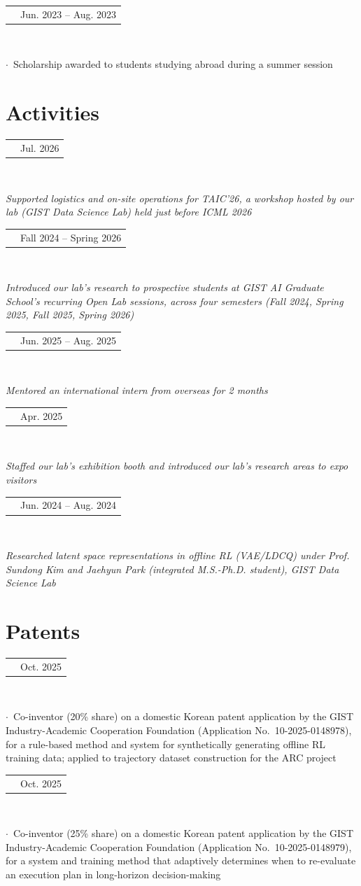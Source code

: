 \documentclass[10.5pt,a4paper]{article}
\makeatletter
\newcommand{\entry}[3]{%
  \noindent\begin{tabularx}{\linewidth}{@{}>{\raggedright\arraybackslash}X r@{}}
    {\hyphenpenalty=10000\exhyphenpenalty=10000\textbf{#1}} & \textcolor{textgray}{#2}
  \end{tabularx}\\
  {\raggedright\textit{\textcolor{textgray}{#3}}\par}\vspace{0.5em}
}
\newcommand{\fund}[3]{%
  \noindent\begin{tabularx}{\linewidth}{@{}>{\raggedright\arraybackslash}X r@{}}
    {\hyphenpenalty=10000\exhyphenpenalty=10000\textbf{#1}} & \textcolor{textgray}{#2}
  \end{tabularx}\\
  {\raggedright\textcolor{textgray}{$\cdot$\ #3}\par}\vspace{0.5em}
}
\makeatother
\begin{document}
\fund{Scholarship for Summer Session Abroad (UC Berkeley)}{Jun. 2023 -- Aug. 2023}
{Scholarship awarded to students studying abroad during a summer session}

\section{Activities}

\entry{TAIC'26: Thinking about AI's Capability -- Operations Staff}{Jul. 2026}
{Supported logistics and on-site operations for TAIC'26, a workshop hosted by our lab (GIST Data Science Lab) held just before ICML 2026}

\entry{GIST AI Graduate School Open Lab -- Lab Presenter}{Fall 2024 -- Spring 2026}
{Introduced our lab's research to prospective students at GIST AI Graduate School's recurring Open Lab sessions, across four semesters (Fall 2024, Spring 2025, Fall 2025, Spring 2026)}

\entry{GIST Global Internship Program (GIP) -- Mentor}{Jun. 2025 -- Aug. 2025}
{Mentored an international intern from overseas for 2 months}

\entry{2025 Korea Science \& Technology Grand Fair ({\cjkfont 대한민국과학기술대전}) -- Booth Staff}{Apr. 2025}
{Staffed our lab's exhibition booth and introduced our lab's research areas to expo visitors}

\entry{GIST Summer Undergraduate Research Fellowship (G-SURF) -- Researcher}{Jun. 2024 -- Aug. 2024}
{Researched latent space representations in offline RL (VAE/LDCQ) under Prof. Sundong Kim and Jaehyun Park (integrated M.S.-Ph.D. student), GIST Data Science Lab}

\newpage
\section{Patents}

\fund{{\cjkfont\bfseries [특허출원] 오프라인 강화학습을 위한 규칙 기반 합성 데이터 생성 방법 및 시스템}}{Oct. 2025}
{Co-inventor (20\% share) on a domestic Korean patent application by the GIST Industry-Academic Cooperation Foundation (Application No.\ 10-2025-0148978), for a rule-based method and system for synthetically generating offline RL training data; applied to trajectory dataset construction for the ARC project}

\fund{{\cjkfont\bfseries [특허출원] 적응적 재평가 기반 실행 시스템 및 이의 제어 방법, 그리고 적응적 재평가 기반 실행 시스템의 학습 방법}}{Oct. 2025}
{Co-inventor (25\% share) on a domestic Korean patent application by the GIST Industry-Academic Cooperation Foundation (Application No.\ 10-2025-0148979), for a system and training method that adaptively determines when to re-evaluate an execution plan in long-horizon decision-making}
\end{document}
